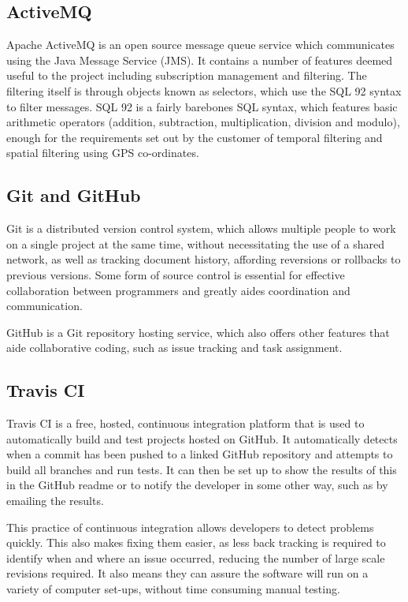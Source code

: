 \documentclass[a4paper, 12pt, twoside]{article}
\begin{document}
\subsection{ActiveMQ}
\label{sec:bg_activemq}

Apache ActiveMQ is an open source message queue service which communicates using the Java Message Service (JMS). It contains a number of features deemed useful to the project including subscription management and filtering. The filtering itself is through objects known as selectors, which use the SQL 92 syntax to filter messages. SQL 92 is a fairly barebones SQL syntax, which features basic arithmetic operators (addition, subtraction, multiplication, division and modulo), enough for the requirements set out by the customer of temporal filtering and spatial filtering using GPS co-ordinates.

\subsection{Git and GitHub}
\label{sec:bg_git}

Git is a distributed version control system, which allows multiple people to work on a single project at the same time, without necessitating the use of a shared network, as well as tracking document history, affording reversions or rollbacks to previous versions. Some form of source control is essential for effective collaboration between programmers and greatly aides coordination and communication.

GitHub is a Git repository hosting service, which also offers other features that aide collaborative coding, such as issue tracking and task assignment.

\subsection{Travis CI}
\label{sec:bg_travis}

Travis CI is a free, hosted, continuous integration platform that is used to automatically build and test projects hosted on GitHub. It automatically detects when a commit has been pushed to a linked GitHub repository and attempts to build all branches and run tests. It can then be set up to show the results of this in the GitHub readme or to notify the developer in some other way, such as by emailing the results.

This practice of continuous integration allows developers to detect problems quickly. This also makes fixing them easier, as less back tracking is required to identify when and where an issue occurred, reducing the number of large scale revisions required. It also means they can assure the software will run on a variety of computer set-ups, without time consuming manual testing.
\end{document}
